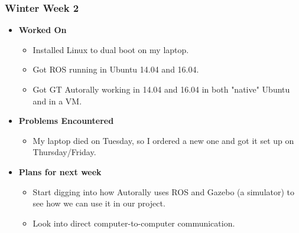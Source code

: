 \documentclass[compsoc,draftclsnofoot,onecolumn,10pt]{IEEEtran}
\begin{document}
\subsubsection{Winter Week 2}
\begin{itemize}
    \item {\textbf{Worked On}}
    \begin{itemize}
        \item Installed Linux to dual boot on my laptop.
        \item Got ROS running in Ubuntu 14.04 and 16.04.
        \item Got GT Autorally working in 14.04 and 16.04 in both "native" Ubuntu and in a VM.
    \end{itemize}

    \item {\textbf{Problems Encountered}}
    \begin{itemize}
        \item My laptop died on Tuesday, so I ordered a new one and got it set up on Thursday/Friday.
    \end{itemize}

    \item{\textbf{Plans for next week}}
    \begin{itemize}
        \item Start digging into how Autorally uses ROS and Gazebo (a simulator) to see how we can use it in our project.
        \item Look into direct computer-to-computer communication.
    \end{itemize}
\end{itemize}
\end{document}
